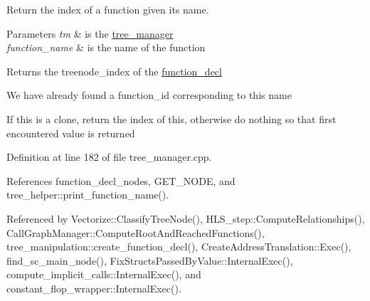 Return the index of a function given its name. 


\begin{DoxyParams}{Parameters}
{\em tm} & is the \hyperlink{classtree__manager}{tree\+\_\+manager} \\
\hline
{\em function\+\_\+name} & is the name of the function \\
\hline
\end{DoxyParams}
\begin{DoxyReturn}{Returns}
the treenode\+\_\+index of the \hyperlink{structfunction__decl}{function\+\_\+decl} 
\end{DoxyReturn}
We have already found a function\+\_\+id corresponding to this name

If this is a clone, return the index of this, otherwise do nothing so that first encountered value is returned 

Definition at line 182 of file tree\+\_\+manager.\+cpp.



References function\+\_\+decl\+\_\+nodes, G\+E\+T\+\_\+\+N\+O\+DE, and tree\+\_\+helper\+::print\+\_\+function\+\_\+name().



Referenced by Vectorize\+::\+Classify\+Tree\+Node(), H\+L\+S\+\_\+step\+::\+Compute\+Relationships(), Call\+Graph\+Manager\+::\+Compute\+Root\+And\+Reached\+Functions(), tree\+\_\+manipulation\+::create\+\_\+function\+\_\+decl(), Create\+Address\+Translation\+::\+Exec(), find\+\_\+sc\+\_\+main\+\_\+node(), Fix\+Structs\+Passed\+By\+Value\+::\+Internal\+Exec(), compute\+\_\+implicit\+\_\+calls\+::\+Internal\+Exec(), and constant\+\_\+flop\+\_\+wrapper\+::\+Internal\+Exec().

